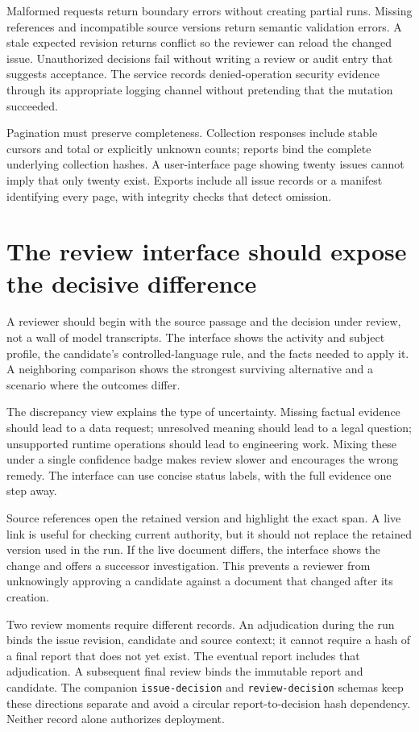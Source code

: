 Malformed requests return boundary errors without creating partial runs. Missing
references and incompatible source versions return semantic validation errors.
A stale expected revision returns conflict so the reviewer can reload the changed
issue. Unauthorized decisions fail without writing a review or audit entry that
suggests acceptance. The service records denied-operation security evidence
through its appropriate logging channel without pretending that the mutation
succeeded.

Pagination must preserve completeness. Collection responses include stable cursors
and total or explicitly unknown counts; reports bind the complete underlying
collection hashes. A user-interface page showing twenty issues cannot imply that
only twenty exist. Exports include all issue records or a manifest identifying
every page, with integrity checks that detect omission.

\section{The review interface should expose the decisive difference}
\label{merge:M08:08}


A reviewer should begin with the source passage and the decision under review,
not a wall of model transcripts. The interface shows the activity and subject
profile, the candidate's controlled-language rule, and the facts needed to apply
it. A neighboring comparison shows the strongest surviving alternative and a
scenario where the outcomes differ.

The discrepancy view explains the type of uncertainty. Missing factual evidence
should lead to a data request; unresolved meaning should lead to a legal question;
unsupported runtime operations should lead to engineering work. Mixing these
under a single confidence badge makes review slower and encourages the wrong
remedy. The interface can use concise status labels, with the full evidence one
step away.

Source references open the retained version and highlight the exact span. A live
link is useful for checking current authority, but it should not replace the
retained version used in the run. If the live document differs, the interface
shows the change and offers a successor investigation. This prevents a reviewer
from unknowingly approving a candidate against a document that changed after
its creation.


Two review moments require different records. An adjudication during the run
binds the issue revision, candidate and source context; it cannot require a hash
of a final report that does not yet exist. The eventual report includes that
adjudication. A subsequent final review binds the immutable report and candidate.
The companion \texttt{issue-decision} and \texttt{review-decision} schemas keep
these directions separate and avoid a circular report-to-decision hash dependency.
Neither record alone authorizes deployment.

